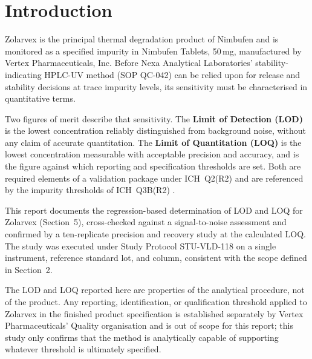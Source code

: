 
\section{Introduction}

Zolarvex is the principal thermal degradation product of Nimbufen and is monitored as
a specified impurity in Nimbufen Tablets, 50\,mg, manufactured by Vertex
Pharmaceuticals, Inc. Before Nexa Analytical Laboratories' stability-indicating
HPLC-UV method (SOP QC-042) can be relied upon for release and stability decisions at
trace impurity levels, its sensitivity must be characterised in quantitative terms.

Two figures of merit describe that sensitivity. The \textbf{Limit of Detection (LOD)}
is the lowest concentration reliably distinguished from background noise, without any
claim of accurate quantitation. The \textbf{Limit of Quantitation (LOQ)} is the lowest
concentration measurable with acceptable precision and accuracy, and is the figure
against which reporting and specification thresholds are set. Both are required
elements of a validation package under ICH~Q2(R2) \citep{ich2023q2r2} and are
referenced by the impurity thresholds of ICH~Q3B(R2) \citep{ich2005q3b}.

This report documents the regression-based determination of LOD and LOQ for Zolarvex
(Section~5), cross-checked against a signal-to-noise assessment and confirmed by a
ten-replicate precision and recovery study at the calculated LOQ. The study was
executed under Study Protocol STU-VLD-118 on a single instrument, reference standard
lot, and column, consistent with the scope defined in Section~2.

\begin{tcolorbox}[notebox, title={\faExclamationTriangle\ Relationship to Specification Limits}]
\footnotesize
The LOD and LOQ reported here are properties of the analytical procedure, not of the
product. Any reporting, identification, or qualification threshold applied to Zolarvex
in the finished product specification is established separately by Vertex
Pharmaceuticals' Quality organisation and is out of scope for this report; this study
only confirms that the method is analytically capable of supporting whatever threshold
is ultimately specified.
\end{tcolorbox}
